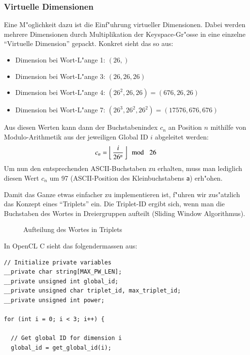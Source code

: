 \begin{refsection}
\subsubsection{Virtuelle Dimensionen}
\label{crypt:virtuelle_dimensionen}

Eine M"oglichkeit dazu ist die Einf"uhrung virtueller Dimensionen. Dabei werden
mehrere Dimensionen durch Multiplikation der Keyspace-Gr"osse in eine einzelne
``Virtuelle Dimension'' gepackt. Konkret sieht das so aus:

\begin{itemize}
	\item Dimension bei Wort-L"ange 1: $(26,)$
	\item Dimension bei Wort-L"ange 3: $(26, 26, 26)$
	\item Dimension bei Wort-L"ange 4: $(26^2, 26, 26) = (676, 26, 26)$
	\item Dimension bei Wort-L"ange 7: $(26^3, 26^2, 26^2) = (17576, 676, 676)$
\end{itemize}

\noindent Aus diesen Werten kann dann der Buchstabenindex $c_n$ an Position $n$
mithilfe von Modulo-Arithmetik aus der jeweiligen Global ID $i$ abgeleitet
werden:
\[
	c_n = \left\lfloor\,\frac{i}{26^n}\,\right\rfloor\! \mod\enskip 26
\]
Um nun den entsprechenden ASCII-Buchstaben zu erhalten, muss man lediglich
diesen Wert $c_n$ um 97 (ASCII-Position des Kleinbuchstabens \texttt{a})
erh"ohen.

Damit das Ganze etwas einfacher zu implementieren ist, f"uhren wir zus"atzlich
das Konzept eines ``Triplets'' ein. Die Triplet-ID ergibt sich, wenn man die
Buchstaben des Wortes in Dreiergruppen aufteilt (Sliding Window Algorithmus).

\begin{figure}[H]
	\centering
	
	\caption{Aufteilung des Wortes in Triplets}
	\label{img:crypto:triplets}
\end{figure}

\noindent In OpenCL C sieht das folgendermassen aus:

\begin{small}
\begin{verbatim}
// Initialize private variables
__private char string[MAX_PW_LEN];
__private unsigned int global_id;
__private unsigned char triplet_id, max_triplet_id;
__private unsigned int power;

for (int i = 0; i < 3; i++) {

  // Get global ID for dimension i
  global_id = get_global_id(i);


\end{verbatim}
\end{small}
\end{refsection}
